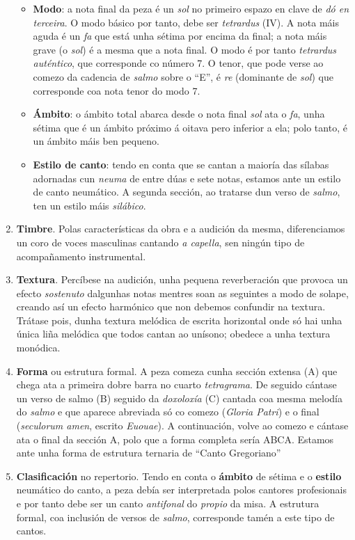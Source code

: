 \documentclass[a4paper, twoside]{templates/ociamthesis}
\providecommand{\tightlist}{%
  \setlength{\itemsep}{0pt}\setlength{\parskip}{0pt}}
\begin{document}
\begin{enumerate}
  \begin{itemize}
  \tightlist
  \item
    \textbf{Modo}: a nota final da peza é un \emph{sol} no primeiro espazo en clave de \emph{dó en terceira}. O modo básico por tanto, debe ser \emph{tetrardus} (IV). A nota máis aguda é un \emph{fa} que está unha sétima por encima da final; a nota máis grave (o \emph{sol}) é a mesma que a nota final. O modo é por tanto \emph{tetrardus auténtico}, que corresponde co número 7. O tenor, que pode verse ao comezo da cadencia de \emph{salmo} sobre o ``E'', é \emph{re} (dominante de \emph{sol}) que corresponde coa nota tenor do modo 7.\\
  \item
    \textbf{Ámbito}: o ámbito total abarca desde o nota final \emph{sol} ata o \emph{fa}, unha sétima que é un ámbito próximo á oitava pero inferior a ela; polo tanto, é un ámbito máis ben pequeno.\\
  \item
    \textbf{Estilo de canto}: tendo en conta que se cantan a maioría das sílabas adornadas cun \emph{neuma} de entre dúas e sete notas, estamos ante un estilo de canto neumático. A segunda sección, ao tratarse dun verso de \emph{salmo}, ten un estilo máis \emph{silábico}.
  \end{itemize}
\item
  \textbf{Timbre}. Polas características da obra e a audición da mesma, diferenciamos un coro de voces masculinas cantando \emph{a capella}, sen ningún tipo de acompañamento instrumental.
\item
  \textbf{Textura}. Percíbese na audición, unha pequena reverberación que provoca un efecto \emph{sostenuto} dalgunhas notas mentres soan as seguintes a modo de solape, creando así un efecto harmónico que non debemos confundir na textura. Trátase pois, dunha textura melódica de escrita horizontal onde só hai unha única liña melódica que todos cantan ao unísono; obedece a unha textura monódica.
\item
  \textbf{Forma} ou estrutura formal. A peza comeza cunha sección extensa (A) que chega ata a primeira dobre barra no cuarto \emph{tetragrama}. De seguido cántase un verso de salmo (B) seguido da \emph{doxoloxía} (C) cantada coa mesma melodía do \emph{salmo} e que aparece abreviada só co comezo (\emph{Gloria Patri}) e o final (\emph{seculorum amen}, escrito \emph{Euouae}). A continuación, volve ao comezo e cántase ata o final da sección A, polo que a forma completa sería ABCA. Estamos ante unha forma de estrutura ternaria de ``Canto Gregoriano''
\item
  \textbf{Clasificación} no repertorio. Tendo en conta o \textbf{ámbito} de sétima e o \textbf{estilo} neumático do canto, a peza debía ser interpretada polos cantores profesionais e por tanto debe ser un canto \emph{antifonal} do \emph{propio} da misa. A estrutura formal, coa inclusión de versos de \emph{salmo}, corresponde tamén a este tipo de cantos.
\end{enumerate}
\end{document}
